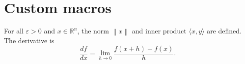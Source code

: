 \documentclass{article}
\newcommand{\R}{\mathbb{R}}
\newcommand{\norm}[1]{\left\| #1 \right\|}
\newcommand{\inner}[2]{\langle #1, #2 \rangle}
\def\eps{\varepsilon}
\newcommand{\diff}[2]{\frac{d #1}{d #2}}
\begin{document}
\section{Custom macros}
For all $\eps > 0$ and $x \in \R^n$, the norm $\norm{x}$ and inner product
$\inner{x}{y}$ are defined. The derivative is
\[
\diff{f}{x} = \lim_{h \to 0} \frac{f(x+h) - f(x)}{h}.
\]
\end{document}
